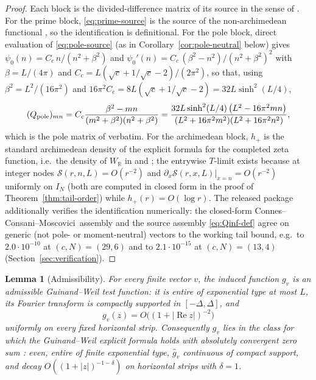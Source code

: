 \documentclass[11pt]{article}
\theoremstyle{plain}
\newtheorem{lemma}[theorem]{Lemma}
\theoremstyle{definition}
\theoremstyle{remark}
\newcommand{\R}{\mathbb R}
\newcommand{\ccm}{Connes--Consani--Moscovici}
\newcommand{\wh}{\widehat}
\newcommand{\WR}{W_{\R}}
\begin{document}
\begin{proof}
Each block is the divided-difference matrix of its source in the sense of
\cite[Prop.~4.1]{ConnesvanSuijlekom2025}.  For the prime block,
\eqref{eq:prime-source} is the source of the non-archimedean functional
\cite[Eq.~(3.16)]{ConnesConsaniMoscovici2025}, so the identification is
definitional.  For the pole block, direct evaluation of \eqref{eq:pole-source}
(as in Corollary~\ref{cor:pole-neutral} below) gives
$\psi_0(n)=C_c\,n/(n^2+\beta^2)$ and
$\psi_0'(n)=C_c\,(\beta^2-n^2)/(n^2+\beta^2)^2$ with $\beta=L/(4\pi)$ and
$C_c=L(\sqrt c+1/\sqrt c-2)/(2\pi^2)$, so that, using
$\beta^2=L^2/(16\pi^2)$ and
$16\pi^2C_c=8L(\sqrt c+1/\sqrt c-2)=32L\sinh^2(L/4)$,
\[
 (Q_{\rm pole})_{mn}
 =C_c\frac{\beta^2-mn}{(m^2+\beta^2)(n^2+\beta^2)}
 =\frac{32L\sinh^2(L/4)\,\bigl(L^2-16\pi^2mn\bigr)}
       {(L^2+16\pi^2m^2)(L^2+16\pi^2n^2)},
\]
which is the pole matrix of \cite[Lemma~4.1]{ConnesConsaniMoscovici2025}
verbatim.  For the archimedean block, $h_+$ is the standard
archimedean density of the explicit formula for the completed zeta function,
i.e.\ the density of $\WR$ in
\cite[Sec.~3]{ConnesConsaniMoscovici2025} and
\cite[Eq.~(153)]{ConnesConsani2020}; the entrywise $T$-limit exists because at
integer nodes $\mathcal S(r,n,L)=O(r^{-2})$ and
$\partial_x\mathcal S(r,x,L)|_{x=n}=O(r^{-2})$ uniformly on $I_N$
(both are computed in closed form in the proof of
Theorem~\ref{thm:tail-order}) while $h_+(r)=O(\log r)$.  The released package
additionally verifies the identification numerically: the closed-form \ccm\
assembly and the source assembly \eqref{eq:Qinf-def} agree on generic (not
pole- or moment-neutral) vectors to the working tail bound, e.g.\ to
$2.0\cdot10^{-10}$ at $(c,N)=(29,6)$ and to $2.1\cdot10^{-15}$ at
$(c,N)=(13,4)$ (Section~\ref{sec:verification}).
\end{proof}

\begin{lemma}[Admissibility]\label{lem:admissible}
For every finite vector $v$, the induced function $g_v$ is an admissible
Guinand--Weil test function: it is entire of exponential type at most $L$, its
Fourier transform is compactly supported in $[-\Delta,\Delta]$, and
\[
        g_v(z)=O\bigl((1+|\operatorname{Re}z|)^{-2}\bigr)
\]
uniformly on every fixed horizontal strip.  Consequently $g_v$ lies in the
class for which the Guinand--Weil explicit formula holds with absolutely
convergent zero sum
\cite[Sec.~2]{Bombieri2000}: even, entire of finite exponential type,
$\wh g_v$ continuous of compact support, and decay
$O((1+|z|)^{-1-\delta})$ on horizontal strips with $\delta=1$.
\end{lemma}
\end{document}
